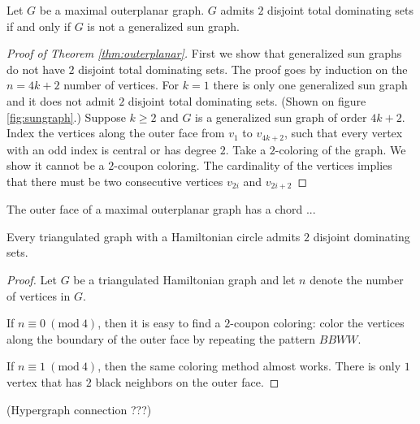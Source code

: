 \begin{thm}\label{thm:outerplanar}
  Let $G$ be a maximal outerplanar graph. $G$ admits $2$ disjoint total dominating
  sets if and only if $G$ is not a generalized sun graph.
\end{thm}
\begin{proof}[Proof of Theorem \ref{thm:outerplanar}]
  First we show that generalized sun graphs do not have $2$ disjoint total
  dominating sets. The proof goes by induction on the $n = 4k + 2$ number of vertices.
  For $k = 1$ there is only one generalized sun graph and it does not admit $2$
  disjoint total dominating sets. (Shown on figure \ref{fig:sungraph}.)
  Suppose $k \ge 2$ and $G$ is a generalized sun graph of order $4k + 2$. Index
  the vertices along the outer face from $v_1$ to $v_{4k + 2}$, such that every
  vertex with an odd index is central or has degree $2$. Take a $2$-coloring of
  the graph. We show it cannot be a $2$-coupon coloring. The cardinality of the
  vertices implies that there must be two consecutive vertices $v_{2i}$ and $v_{2i + 2}$
\end{proof}

\begin{lemma}
  The outer face of a maximal outerplanar graph has a chord ...
\end{lemma}

\begin{thm}
  Every triangulated graph with a Hamiltonian circle admits $2$ disjoint
  dominating sets.
\end{thm}
\begin{proof}
  Let $G$ be a triangulated Hamiltonian graph and let $n$ denote the number of
  vertices in $G$.

  If $n \equiv 0\ (\textrm{mod}\ 4)$, then it is easy to find a $2$-coupon coloring:
  color the vertices along the boundary of the outer face by repeating the pattern
  $BBWW$.

  If $n \equiv 1\ (\textrm{mod}\ 4)$, then the same coloring method almost works.
  There is only $1$ vertex that has $2$ black neighbors on the outer face.
\end{proof}


(Hypergraph connection ???)

